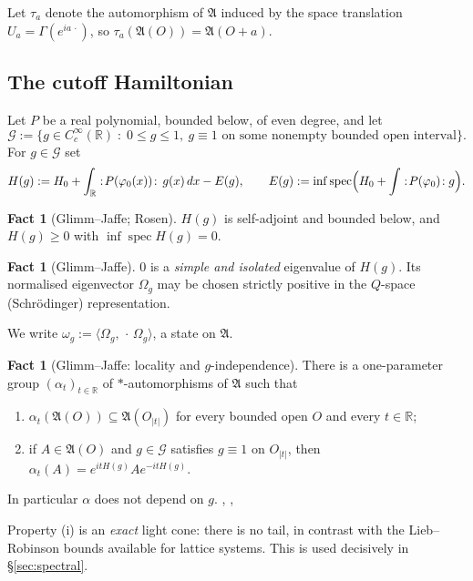 \documentclass[11pt,a4paper]{article}
\theoremstyle{plain}
\theoremstyle{definition}
\newtheorem{fact}[theorem]{Fact}
\newcommand{\A}{\mathfrak{A}}
\newcommand{\G}{\mathcal{G}}
\newcommand{\R}{\mathbb{R}}
\newcommand{\Om}{\Omega}
\newcommand{\ip}[2]{\langle #1,#2\rangle}
\DeclareMathOperator{\spec}{spec}
\begin{document}
Let $\tau_a$ denote the automorphism of $\A$ induced by the space translation
$U_a=\Gamma(e^{ia\,\cdot})$, so $\tau_a(\A(O))=\A(O+a)$.

\subsection{The cutoff Hamiltonian}

Let $P$ be a real polynomial, bounded below, of even degree, and let
\[
  \G:=\bigl\{g\in C_c^\infty(\R)\;:\;0\le g\le 1,\ g\equiv1 \text{ on some nonempty bounded open
  interval}\bigr\}.
\]
For $g\in\G$ set
\[
  H(g):=H_0+\int_\R :\!P(\varphi_0(x))\!:\,g(x)\,dx-E(g),
  \qquad
  E(g):=\inf\spec\Bigl(H_0+\int :\!P(\varphi_0)\!:g\Bigr).
\]

\begin{fact}[Glimm--Jaffe; Rosen]\label{fact:sa}
$H(g)$ is self-adjoint and bounded below, and $H(g)\ge0$ with $\inf\spec H(g)=0$.
\cite{GJI,Rosen70,GJ71}
\end{fact}

\begin{fact}[Glimm--Jaffe]\label{fact:vac}
$0$ is a \emph{simple and isolated} eigenvalue of $H(g)$. Its normalised eigenvector $\Om_g$ may
be chosen strictly positive in the $Q$-space (Schr\"odinger) representation.
\cite[\S2.2--2.3]{GJII}
\end{fact}

We write $\omega_g:=\ip{\Om_g}{\,\cdot\,\Om_g}$, a state on $\A$.

\begin{fact}[Glimm--Jaffe: locality and $g$-independence]\label{fact:loc}
There is a one-parameter group $(\alpha_t)_{t\in\R}$ of $*$-automorphisms of $\A$ such that
\begin{enumerate}
\item[\rm(i)] $\alpha_t(\A(O))\subseteq\A(O_{|t|})$ for every bounded open $O$ and every $t\in\R$;
\item[\rm(ii)] if $A\in\A(O)$ and $g\in\G$ satisfies $g\equiv1$ on $O_{|t|}$, then
      $\alpha_t(A)=e^{itH(g)}Ae^{-itH(g)}$.
\end{enumerate}
In particular $\alpha$ does not depend on $g$. \cite[\S III]{GJI}, \cite[\S3.5--3.6]{GJII},
\cite[\S4.1]{GJExp}
\end{fact}

Property (i) is an \emph{exact} light cone: there is no tail, in contrast with the Lieb--Robinson
bounds available for lattice systems. This is used decisively in \S\ref{sec:spectral}.
\end{document}
